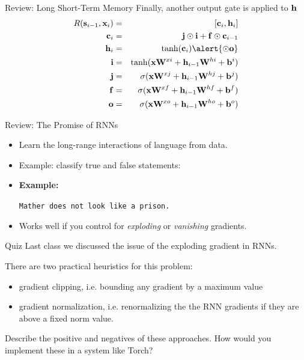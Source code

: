 \documentclass{beamer}
\begin{document}
\begin{frame}{Review: Long Short-Term Memory}
  Finally, another output gate is applied to $\mathbf{h}$
    \begin{eqnarray*}
      R(\bold \bolds_{i-1}, \boldx_i) &=& [\boldc_i, \boldh_i]  \\
      \boldc_i &=& \boldj \odot \boldi  + \bold f \odot \bold c_{i-1}    \\
      \boldh_i &=& \tanh(\boldc_i) \alert{\odot \boldo}\\ 
      \boldi &=& \tanh(\boldx \boldW^{xi} + \boldh_{i-1}\boldW^{hi} + \boldb^i) \\
      \boldj &=& \sigma(\boldx \boldW^{xj} + \boldh_{i-1}\boldW^{hj} + \boldb^j) \\
      \boldf &=& \sigma(\boldx \boldW^{xf} + \boldh_{i-1}\boldW^{hf} + \boldb^f) \\
      \boldo &=& \sigma(\boldx \boldW^{xo} + \boldh_{i-1}\boldW^{ho} + \boldb^o) \\
    \end{eqnarray*}
\end{frame}

\begin{frame}{Review: The Promise of RNNs}
  \begin{itemize}
  \item Learn the long-range interactions of language from data.
    \air 

  \item Example: classify true and false statements:
    \pause 

  \item \textbf{Example:}
    \air 

    \air 
    
    \alert{\texttt{Mather does not look like a prison.}}
    \air 
    
  \item Works well if you control for \textit{exploding} or \textit{vanishing} gradients.
  \end{itemize}
\end{frame}


\begin{frame}{Quiz}
  Last class we discussed the issue of 
  the exploding gradient in RNNs. 
  
  There are two practical heuristics  
  for this problem:
  \begin{itemize}
  \item gradient clipping, i.e. bounding any gradient
    by a maximum value 
  \item gradient normalization, i.e. renormalizing the 
    the RNN gradients if they are above a fixed norm 
    value.
  \end{itemize}

  \air 

  Describe the positive and negatives of these approaches.
  How would you implement these in a system like Torch?  
\end{frame}
\end{document}
